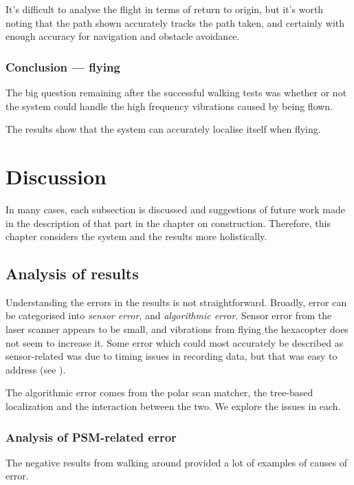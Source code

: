 \documentclass[12pt,oneside,a4paper]{book}
\begin{document}
It's difficult to analyse the flight in terms of return to origin, but
it's worth noting that the path shown accurately tracks the path
taken, and certainly with enough accuracy for navigation and obstacle
avoidance.
\newpage
\subsection{Conclusion --- flying}
\label{sec:conclusion-flying}

The big question remaining after the successful walking tests was
whether or not the system could handle the high frequency vibrations
caused by being flown. 

The results show that the system can accurately localise itself when
flying. 

\chapter{Discussion}
\label{cha:discussion}

 In many cases, each subsection is
discussed and suggestions of future work made in the description of
that part in the chapter on construction. Therefore, this chapter
considers the system and the results more holistically.

\section{Analysis of results}
\label{sec:analysis-results}

Understanding the errors in the results is not
straightforward. Broadly, error can be categorised into \emph{sensor
  error}, and \emph{algorithmic error}. Sensor error from the laser
scanner appears to be small, and vibrations from flying the hexacopter
does not seem to increase it. Some error which could most accurately
be described as sensor-related was due to timing issues in recording
data, but that was easy to address (see ).

The algorithmic error comes from the polar scan matcher, the
tree-based localization and the interaction between the two. We
explore the issues in each.

\subsection{Analysis of PSM-related error}
\label{sec:psm-error}

The negative results from walking around provided a lot of examples of
causes of error.
\end{document}
